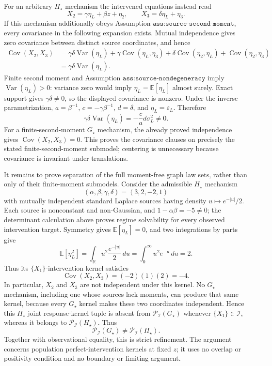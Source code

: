 For an arbitrary \(H_\star\) mechanism the intervened equations instead read
\[
 X_2=\gamma\eta_L+\beta z+\eta_2,
 \qquad
 X_3=\delta\eta_L+\eta_3.
\]
If this mechanism additionally obeys Assumption \(\texttt{ass:source-second-moment}\), every covariance in the following expansion exists. Mutual independence gives zero covariance between distinct source coordinates, and hence
\[
 \begin{aligned}
 \operatorname{Cov}(X_2,X_3)
 &=\gamma\delta\operatorname{Var}(\eta_L)
   +\gamma\operatorname{Cov}(\eta_L,\eta_3)
   +\delta\operatorname{Cov}(\eta_2,\eta_L)
   +\operatorname{Cov}(\eta_2,\eta_3)\\
 &=\gamma\delta\operatorname{Var}(\eta_L).
 \end{aligned}
\]
Finite second moment and Assumption \(\texttt{ass:source-nondegeneracy}\) imply \(\operatorname{Var}(\eta_L)>0\): variance zero would imply \(\eta_L=\mathbb E[\eta_L]\) almost surely. Exact support gives \(\gamma\delta\ne0\), so the displayed covariance is nonzero. Under the inverse parametrization, \(a=\beta^{-1}\), \(c=-\gamma\beta^{-1}\), \(d=\delta\), and \(\eta_L=\varepsilon_L\). Therefore
\[
 \gamma\delta\operatorname{Var}(\eta_L)
 =-\frac ca d\sigma_L^2\ne0.
\]
For a finite-second-moment \(G_\star\) mechanism, the already proved independence gives \(\operatorname{Cov}(X_2,X_3)=0\). This proves the covariance clauses on precisely the stated finite-second-moment submodel; centering is unnecessary because covariance is invariant under translations.

It remains to prove separation of the full moment-free graph law sets, rather than only of their finite-moment submodels. Consider the admissible \(H_\star\) mechanism
\[
 (\alpha,\beta,\gamma,\delta)=(3,2,-2,1)
\]
with mutually independent standard Laplace sources having density \(u\mapsto e^{-|u|}/2\). Each source is nonconstant and non-Gaussian, and \(1-\alpha\beta=-5\ne0\); the determinant calculation above proves regime solvability for every observed intervention target. Symmetry gives \(\mathbb E[\eta_L]=0\), and two integrations by parts give
\[
 \mathbb E[\eta_L^2]
 =\int_{\mathbb R}u^2\frac{e^{-|u|}}2\,du
 =\int_0^\infty u^2e^{-u}\,du
 =2.
\]
Thus its \(\{X_1\}\)-intervention kernel satisfies
\[
 \operatorname{Cov}(X_2,X_3)
 =(-2)(1)(2)=-4.
\]
In particular, \(X_2\) and \(X_3\) are not independent under this kernel. No \(G_\star\) mechanism, including one whose sources lack moments, can produce that same kernel, because every \(G_\star\) kernel makes these two coordinates independent. Hence this \(H_\star\) joint response-kernel tuple is absent from \(\mathcal P_{\mathcal I}(G_\star)\) whenever \(\{X_1\}\in\mathcal I\), whereas it belongs to \(\mathcal P_{\mathcal I}(H_\star)\). Thus
\[
 \mathcal P_{\mathcal I}(G_\star)
 \ne
 \mathcal P_{\mathcal I}(H_\star).
\]
Together with observational equality, this is strict refinement. The argument concerns population perfect-intervention kernels at fixed \(z\); it uses no overlap or positivity condition and no boundary or limiting argument.
